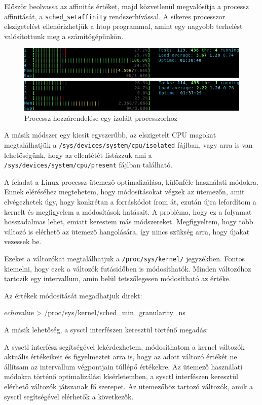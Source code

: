 Először beolvassa az affinitás értéket, majd közvetlenül megvalósítja a processz affinitását, a \texttt{sched\_setaffinity} rendszerhívással.
A sikeres processzor elszigetelést ellenörizhetjük a htop programmal, amint egy nagyobb terhelést valósítottunk meg a számítógépünkön.

\begin{figure}[h!]
\centering
\includegraphics[scale=1.5]{images/tasksetHtop.png}
\caption{Processz hozzárendelése egy izolált processzorhoz}
\label{fig:taskset}
\end{figure}

A másik módszer egy kicsit egyszerűbb, az elszigetelt CPU magokat megtalálhatjük a \texttt{/sys/devices/system/cpu/isolated} fájlban, vagy arra is van lehetőségünk, hogy az ellentétét listázzuk ami a \texttt{/sys/devices/system/cpu/present} fájlban található.

A feladat a Linux processz ütemező optimalizálása, különféle használati módokra.
Ennek eléréséhez megtehetem, hogy módosításokat végzek az ütemezőn, amit elvégezhetek úgy, hogy konkrétan a forráskódot írom át, ezután újra lefordítom a kernelt és megfigyelem a módosítások hatásait.
A probléma, hogy ez a folyamat hosszadalmas lehet, emiatt kerestem más módszereket.
Megfigyeltem, hogy több változó is elérhető az ütemező hangolására, így nincs szükség arra, hogy újakat vezessek be.

Ezeket a változókat megtalálhatjuk a \texttt{/proc/sys/kernel/} jegyzékben.
Fontos kiemelni, hogy ezek a változók futásidőben is módosíthatók. Minden változóhoz tartozik egy intervallum, amin belül tetszőlegesen módosítható az értéke. 

Az értékek módosítását megadhatjuk direkt:
\begin{python}
$ echo $value > /proc/sys/kernel/sched_min_granularity_ns
\end{python}%

A másik lehetőség, a sysctl interfészen keresztül történő megadás:
A sysctl interfész segítségével lekérdezhetem, módosíthatom a kernel változók aktuális értékeikeit és figyelmeztet arra is, hogy az adott változó értékét ne állítsam az intervallum végpontjain túllépő értékekre.
Az ütemező használati módokra történő optimalizálási kísérletemben, a sysctl interfészen keresztül elérhető változók játszanak fő szerepet. Az ütemezőhöz tartozó változók, amik a sysctl segítségével elérhetők a következők.

